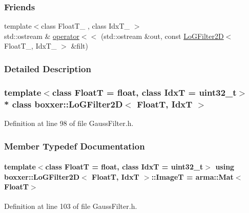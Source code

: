 \subsubsection*{Friends}
\begin{DoxyCompactItemize}
\item 
{\footnotesize template$<$class Float\+T\+\_\+ , class Idx\+T\+\_\+ $>$ }\\std\+::ostream \& \hyperlink{classboxxer_1_1LoGFilter2D_acc81dcf998cd022738122bd24335c6a8}{operator$<$$<$} (std\+::ostream \&out, const \hyperlink{classboxxer_1_1LoGFilter2D}{Lo\+G\+Filter2D}$<$ Float\+T\+\_\+, Idx\+T\+\_\+ $>$ \&filt)
\end{DoxyCompactItemize}


\subsubsection{Detailed Description}
\subsubsection*{template$<$class FloatT = float, class IdxT = uint32\+\_\+t$>$\\*
class boxxer\+::\+Lo\+G\+Filter2\+D$<$ Float\+T, Idx\+T $>$}



Definition at line 98 of file Gauss\+Filter.\+h.



\subsubsection{Member Typedef Documentation}
\paragraph[{\texorpdfstring{ImageT}{ImageT}}]{\setlength{\rightskip}{0pt plus 5cm}template$<$class FloatT  = float, class IdxT  = uint32\+\_\+t$>$ using {\bf boxxer\+::\+Lo\+G\+Filter2D}$<$ FloatT, IdxT $>$\+::{\bf ImageT} =  arma\+::\+Mat$<$FloatT$>$}\hypertarget{classboxxer_1_1LoGFilter2D_ad05a4ecfd5b16afe3a693bbd71a60425}{}\label{classboxxer_1_1LoGFilter2D_ad05a4ecfd5b16afe3a693bbd71a60425}


Definition at line 103 of file Gauss\+Filter.\+h.

